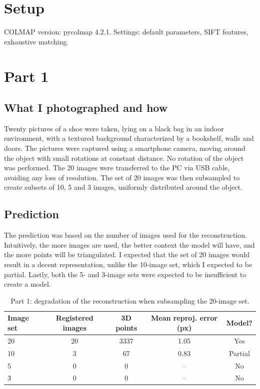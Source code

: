 \documentclass[11pt,a4paper]{article}
\title{\vspace{-1.5cm}{COLMAP Experiments: Spatial AI Report}}
\author{
    Flavio Massaroni \\
    Student ID: 1990975}
\date{\today}
\begin{document}
\maketitle
\vspace{-0.8cm}

\section*{Setup}
COLMAP version: pycolmap 4.2.1. Settings: default parameters, SIFT features, exhaustive matching.

\section{Part 1}

\subsection*{What I photographed and how}

Twenty pictures of a shoe were taken, lying on a black bag in an indoor environment, with a textured background characterized by a bookshelf, walls and doors. The pictures were captured using a smartphone camera, moving around the object with small rotations at constant distance. No rotation of the object was performed. The 20 images were transferred to the PC via USB cable, avoiding any loss of resolution. The set of 20 images was then subsampled to create subsets of 10, 5 and 3 images, uniformly distributed around the object.

\subsection*{Prediction}
The prediction was based on the number of images used for the reconstruction. Intuitively, the more images are used, the better context the model will have, and the more points will be triangulated. I expected that the set of 20 images would result in a decent representation, unlike the 10-image set, which I expected to be partial. Lastly, both the 5- and 3-image sets were expected to be insufficient to create a model.
\begin{table}[h]
\centering
\begin{tabular}{lcccc}
\toprule
Image set & Registered images & 3D points & Mean reproj. error (px) & Model? \\
\midrule
20 & 20 & 3337 & 1.05 & Yes \\
10 & 3  & 67   & 0.83 & Partial \\
5  & 0  & 0    & -- & No \\
3  & 0  & 0    & -- & No \\
\bottomrule
\end{tabular}
\caption{Part 1: degradation of the reconstruction when subsampling the 20-image set.}
\label{tab:part1}
\end{table}
\end{document}
